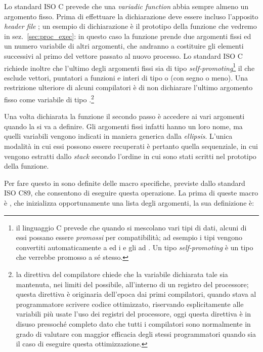 Lo standard ISO C prevede che una \textit{variadic function} abbia sempre
almeno un argomento fisso. Prima di effettuare la dichiarazione deve essere
incluso l'apposito \textit{header file} ; un esempio di
dichiarazione è il prototipo della funzione  che vedremo in
sez.~\ref{sec:proc_exec}:
in questo caso la funzione prende due argomenti fissi ed un numero variabile
di altri argomenti, che andranno a costituire gli elementi successivi al primo
del vettore  passato al nuovo processo. Lo standard ISO C richiede
inoltre che l'ultimo degli argomenti fissi sia di tipo
\textit{self-promoting}\footnote{il linguaggio C prevede che quando si
  mescolano vari tipi di dati, alcuni di essi possano essere \textsl{promossi}
  per compatibilità; ad esempio i tipi  vengono convertiti
  automaticamente a  ed i  e gli  ad
  . Un tipo \textit{self-promoting} è un tipo che verrebbe promosso
  a sé stesso.} il che esclude vettori, puntatori a funzioni e interi di tipo
 o  (con segno o meno). Una restrizione ulteriore di
alcuni compilatori è di non dichiarare l'ultimo argomento fisso come variabile
di tipo .\footnote{la direttiva  del
  compilatore chiede che la variabile dichiarata tale sia mantenuta, nei
  limiti del possibile, all'interno di un registro del processore; questa
  direttiva è originaria dell'epoca dai primi compilatori, quando stava al
  programmatore scrivere codice ottimizzato, riservando esplicitamente alle
  variabili più usate l'uso dei registri del processore, oggi questa direttiva
  è in disuso pressoché completo dato che tutti i compilatori sono normalmente
  in grado di valutare con maggior efficacia degli stessi programmatori quando
  sia il caso di eseguire questa ottimizzazione.}

Una volta dichiarata la funzione il secondo passo è accedere ai vari argomenti
quando la si va a definire. Gli argomenti fissi infatti hanno un loro nome, ma
quelli variabili vengono indicati in maniera generica dalla
\textit{ellipsis}. L'unica modalità in cui essi possono essere recuperati è
pertanto quella sequenziale, in cui vengono estratti dallo \textit{stack}
secondo l'ordine in cui sono stati scritti nel prototipo della funzione.


Per fare questo in  sono definite delle macro specifiche,
previste dallo standard ISO C89, che consentono di eseguire questa operazione.
La prima di queste macro è , che inizializza opportunamente
una lista degli argomenti, la sua definizione è:

